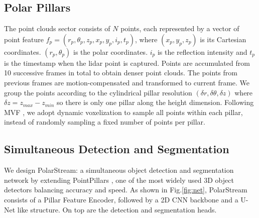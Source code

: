 \documentclass{article}
\begin{document}
\vspace{-2mm}\subsection{Polar Pillars}\label{representation}\vspace{-2mm}
The point clouds sector consists of $N$ points, each represented by a vector of point feature $f_p = (r_p, \theta_p, z_p, x_p, y_p, i_p, t_p)$, where $(x_p, y_p, z_p)$ is its Cartesian coordinates. $(r_p, \theta_p)$ is the polar coordinates. $i_p$ is the reflection intensity and $t_p$ is the timestamp when the lidar point is captured. Points are accumulated from 10 successive frames in total to obtain denser point clouds. The points from previous frames are motion-compensated and transformed to current frame. We group the points according to the cylindrical pillar resolution $(\delta r, \delta \theta, \delta z)$ where $\delta z = z_{max} -z_{min}$ so there is only one pillar along the height dimension. Following MVF \cite{zhou2019end}, we adopt dynamic voxelization to sample all points within each pillar, instead of randomly sampling a fixed number of points per pillar.

\vspace{-3mm}\subsection{Simultaneous Detection and Segmentation}\label{simultaneous}\vspace{-2mm}
We design PolarStream: a simultaneous object detection and segmentation network by extending PointPillars \cite{lang2019pointpillars}, one of the most widely used 3D object detectors balancing accuracy and speed. As shown in Fig.\ref{fig:net}, PolarStream consists of a Pillar Feature Encoder, followed by a 2D CNN backbone and a U-Net\cite{ronneberger2015u} like structure. On top are the detection and segmentation heads. 
\end{document}
